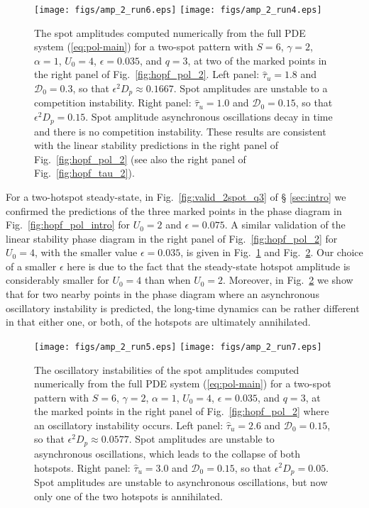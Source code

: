 \documentclass{article}%
\begin{document}
\begin{figure}[htbp]
\centering
\texttt{[image: figs/amp\_2\_run6.eps]}
\texttt{[image: figs/amp\_2\_run4.eps]}
\caption{\label{fig:valid_2_q3_u04} The spot amplitudes
  computed numerically from the full PDE system (\ref{eq:pol-main})
  for a two-spot pattern with $S=6$, $\gamma=2$, $\alpha=1$, $U_0=4$,
  $\epsilon=0.035$, and $q=3$, at two of the marked points in the
  right panel of Fig.~\ref{fig:hopf_pol_2}.  Left panel:
  $\hat{\tau}_u=1.8$ and ${\mathcal D}_0=0.3$, so that $\epsilon^2
  D_p\approx 0.1667$. Spot amplitudes are unstable to a competition
  instability. Right panel: $\hat{\tau}_u=1.0$ and ${\mathcal D}_0=0.15$, so
  that $\epsilon^2D_p = 0.15$. Spot amplitude asynchronous
  oscillations decay in time and there is no competition instability.
  These results are consistent with the linear stability predictions
  in the right panel of Fig.~\ref{fig:hopf_pol_2} (see also the right
  panel of Fig.~\ref{fig:hopf_tau_2}).}
\end{figure}

For a two-hotspot steady-state, in Fig.~\ref{fig:valid_2spot_q3} of \S
\ref{sec:intro} we confirmed the predictions of the three marked
points in the phase diagram in Fig.~\ref{fig:hopf_pol_intro} for
$U_0=2$ and $\epsilon=0.075$. A similar validation of the linear
stability phase diagram in the right panel of
Fig.~\ref{fig:hopf_pol_2} for $U_0=4$, with the smaller value
$\epsilon=0.035$, is given in Fig.~\ref{fig:valid_2_q3_u04} and
Fig.~\ref{fig:valid_2_q3_u04_b}. Our choice of a smaller $\epsilon$
here is due to the fact that the steady-state hotspot amplitude is
considerably smaller for $U_0=4$ than when $U_0=2$. Moreover, in
Fig.~\ref{fig:valid_2_q3_u04_b} we show that for two nearby points in
the phase diagram where an asynchronous oscillatory instability is
predicted, the long-time dynamics can be rather different in that either
one, or both, of the hotspots are ultimately annihilated.

\begin{figure}[htbp]
\centering
\texttt{[image: figs/amp\_2\_run5.eps]}
\texttt{[image: figs/amp\_2\_run7.eps]}
\caption{\label{fig:valid_2_q3_u04_b} The oscillatory
  instabilities of the spot amplitudes computed numerically from the
  full PDE system (\ref{eq:pol-main}) for a two-spot pattern with
  $S=6$, $\gamma=2$, $\alpha=1$, $U_0=4$, $\epsilon=0.035$, and $q=3$,
  at the marked points in the right panel of Fig.~\ref{fig:hopf_pol_2}
  where an oscillatory instability occurs.  Left panel:
  $\hat{\tau}_u=2.6$ and ${\mathcal D}_0=0.15$, so that $\epsilon^2
  D_p\approx 0.0577$. Spot amplitudes are unstable to asynchronous
  oscillations, which leads to the collapse of both hotspots.  Right
  panel: $\hat{\tau}_u=3.0$ and ${\mathcal D}_0=0.15$, so that
  $\epsilon^2 D_p= 0.05$. Spot amplitudes are unstable to asynchronous
  oscillations, but now only one of the two hotspots is annihilated.}
\end{figure}
\end{document}
